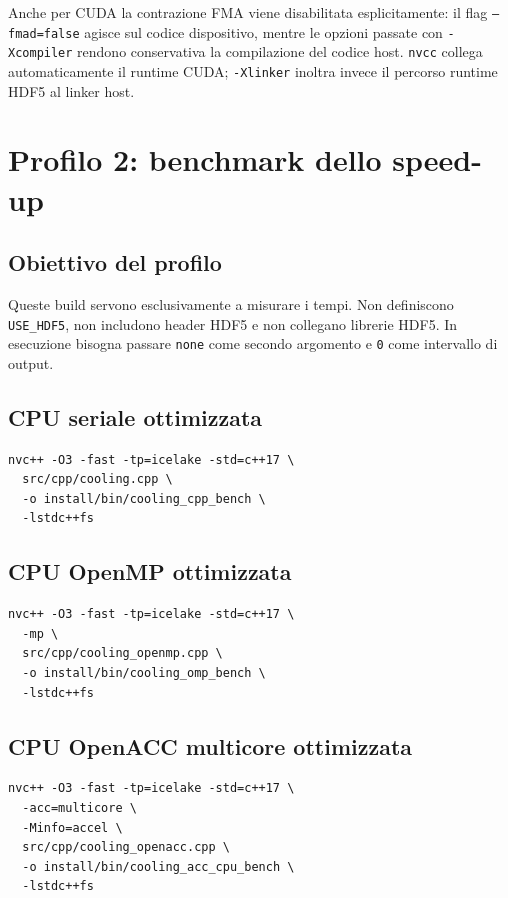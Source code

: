 \documentclass[11pt,a4paper]{article}
\begin{document}
Anche per CUDA la contrazione FMA viene disabilitata esplicitamente: il flag
\texttt{--fmad=false} agisce sul codice dispositivo, mentre le opzioni passate
con \texttt{-Xcompiler} rendono conservativa la compilazione del codice host.
\texttt{nvcc} collega automaticamente il runtime CUDA; \texttt{-Xlinker}
inoltra invece il percorso runtime HDF5 al linker host.


\section{Profilo 2: benchmark dello speed-up}

\subsection{Obiettivo del profilo}

Queste build servono esclusivamente a misurare i tempi. Non definiscono
\texttt{USE\_HDF5}, non includono header HDF5 e non collegano librerie HDF5.
In esecuzione bisogna passare \texttt{none} come secondo argomento e
\texttt{0} come intervallo di output.

\subsection{CPU seriale ottimizzata}

\begin{lstlisting}[style=shell]
nvc++ -O3 -fast -tp=icelake -std=c++17 \
  src/cpp/cooling.cpp \
  -o install/bin/cooling_cpp_bench \
  -lstdc++fs
\end{lstlisting}

\subsection{CPU OpenMP ottimizzata}

\begin{lstlisting}[style=shell]
nvc++ -O3 -fast -tp=icelake -std=c++17 \
  -mp \
  src/cpp/cooling_openmp.cpp \
  -o install/bin/cooling_omp_bench \
  -lstdc++fs
\end{lstlisting}

\subsection{CPU OpenACC multicore ottimizzata}

\begin{lstlisting}[style=shell]
nvc++ -O3 -fast -tp=icelake -std=c++17 \
  -acc=multicore \
  -Minfo=accel \
  src/cpp/cooling_openacc.cpp \
  -o install/bin/cooling_acc_cpu_bench \
  -lstdc++fs
\end{lstlisting}
\end{document}
